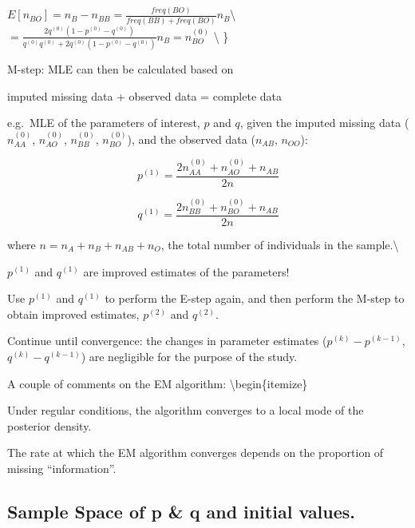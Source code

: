 \documentclass[]{article}
\begin{document}
\(E[n_{BO}] = n_B-n_{BB} = \frac{freq(BO)}{freq(BB)+freq(BO)} n_B\)\textbackslash{}
\hspace*{1.8cm}
\(=\frac{2q^{(0)}(1-p^{(0)}-q^{(0)})}{q^{(0)}q^{(0)}+2q^{(0)}(1-p^{(0)}-q^{(0)})} n_B = n_{BO}^{(0)}\)
\textbackslash{} \} \pagebreak

\item 

M-step: MLE can then be calculated based on
\centerline{imputed missing data + observed data = complete data}
\smallskip

e.g.~MLE of the parameters of interest, \(p\) and \(q\), given the
imputed missing data (\(n_{AA}^{(0)}\), \(n_{AO}^{(0)}\),
\(n_{BB}^{(0)}\), \(n_{BO}^{(0)}\)), and the observed data (\(n_{AB}\),
\(n_{OO}\)):

\[p^{(1)} = \frac{2n_{AA}^{(0)}+n_{AO}^{(0)}+n_{AB}}{2n}\]

\[q^{(1)} = \frac{2n_{BB}^{(0)}+n_{BO}^{(0)}+n_{AB}}{2n}\] \bigskip

where \(n=n_{A}+n_{B}+n_{AB}+n_{O}\), the total number of individuals in
the sample.\textbackslash{}

\(p^{(1)}\) and \(q^{(1)}\) are improved estimates of the parameters!
\pagebreak

\item 

Use \(p^{(1)}\) and \(q^{(1)}\) to perform the E-step again, and then
perform the M-step to obtain improved estimates, \(p^{(2)}\) and
\(q^{(2)}\). \smallskip

\item 

Continue until convergence: the changes in parameter estimates
(\(p^{(k)}-p^{(k-1)}\), \(q^{(k)}-q^{(k-1)}\)) are negligible for the
purpose of the study. \bigskip

\item 

A couple of comments on the EM algorithm: \smallskip
\textbackslash{}begin\{itemize\} \item Under regular conditions, the
algorithm converges to a local mode of the posterior density. \smallskip
\item The rate at which the EM algorithm converges depends on the
proportion of missing ``information''.

\subsection{Sample Space of p \& q and initial
values.}\label{sample-space-of-p-q-and-initial-values.}
\end{document}
